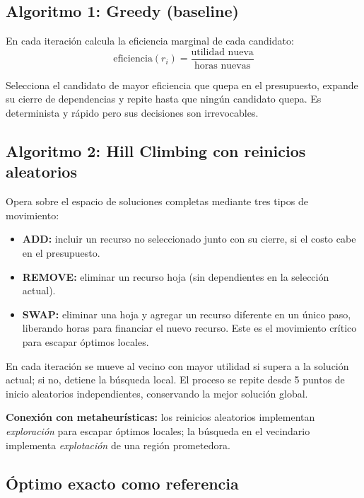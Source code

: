 \documentclass[11pt, a4paper]{article}
\begin{document}
\subsection{Algoritmo 1: Greedy (baseline)}

En cada iteración calcula la eficiencia marginal de cada candidato:
\[
\mathrm{eficiencia}(r_i) = \frac{\text{utilidad nueva}}{\text{horas nuevas}}
\]

Selecciona el candidato de mayor eficiencia que quepa en el presupuesto, expande su cierre de dependencias y repite hasta que ningún candidato quepa. Es determinista y rápido pero sus decisiones son irrevocables.

\subsection{Algoritmo 2: Hill Climbing con reinicios aleatorios}

Opera sobre el espacio de soluciones completas mediante tres tipos de movimiento:

\begin{itemize}[leftmargin=1.5em]
  \item \textbf{ADD:} incluir un recurso no seleccionado junto con su cierre, si el costo cabe en el presupuesto.
  \item \textbf{REMOVE:} eliminar un recurso hoja (sin dependientes en la selección actual).
  \item \textbf{SWAP:} eliminar una hoja y agregar un recurso diferente en un único paso, liberando horas para financiar el nuevo recurso. Este es el movimiento crítico para escapar óptimos locales.
\end{itemize}

En cada iteración se mueve al vecino con mayor utilidad si supera a la solución actual; si no, detiene la búsqueda local. El proceso se repite desde 5 puntos de inicio aleatorios independientes, conservando la mejor solución global.

\begin{notebox}
\textbf{Conexión con metaheurísticas:} los reinicios aleatorios implementan \emph{exploración} para escapar óptimos locales; la búsqueda en el vecindario implementa \emph{explotación} de una región prometedora.
\end{notebox}

\subsection{Óptimo exacto como referencia}
\end{document}
